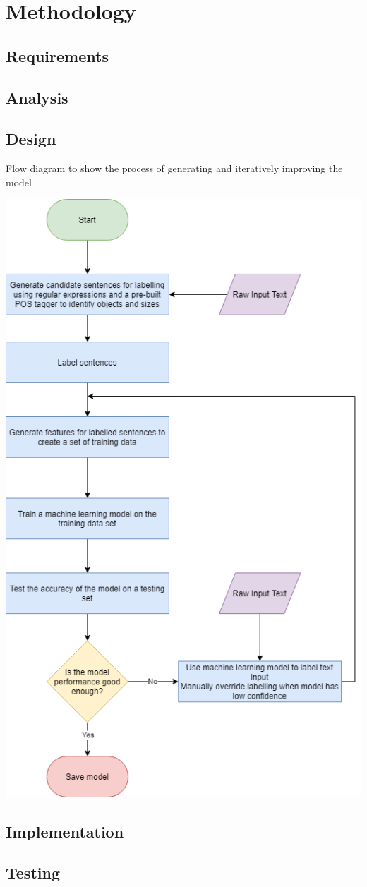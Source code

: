 \chapter{Methodology}




\section{Requirements}



\section{Analysis}




\section{Design}
\caption{Flow diagram to show the process of generating and iteratively improving the model}
\centering
\includegraphics[scale=0.35]{figures/ModelFlowDiagram.png}


\section{Implementation}


\section{Testing}